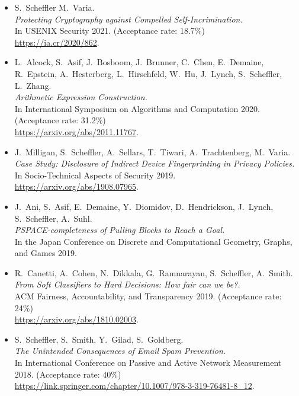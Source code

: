 \documentclass{res}
\begin{document}
\begin{resume}
\begin{itemize}
\item[\foregoneconclusion] S.~Scheffler M.~Varia. \\
\emph{Protecting Cryptography against Compelled Self-Incrimination.} \\
In USENIX Security 2021. (Acceptance rate: 18.7\%)\\
\url{https://ia.cr/2020/862}.

\item[\AEC] L.~Alcock, S.~Asif, J.~Bosboom, J.~Brunner, C.~Chen, E.~Demaine, R.~Epstein,
A.~Hesterberg, L.~Hirschfeld, W.~Hu, J.~Lynch, S.~Scheffler, L.~Zhang. \\
\emph{Arithmetic Expression Construction.} \\
In International Symposium on Algorithms and Computation 2020. (Acceptance rate: 31.2\%) \\
\url{https://arxiv.org/abs/2011.11767}.

\item[\devicefingerprinting] J.~Milligan, S.~Scheffler, A.~Sellars, T.~Tiwari, A.~Trachtenberg, M.~Varia.  \\
\emph{Case Study: Disclosure of Indirect Device Fingerprinting in Privacy Policies.} \\
In Socio-Technical Aspects of Security 2019. \\
\url{https://arxiv.org/abs/1908.07965}.

\item[\pullingblocks] J.~Ani, S.~Asif, E.~Demaine, Y.~Diomidov, D.~Hendrickson, J.~Lynch, S.~Scheffler, A.~Suhl. \\
\emph{PSPACE-completeness of Pulling Blocks to Reach a Goal.}  \\
In the Japan Conference on Discrete and Computational Geometry, Graphs, and Games 2019.

\item[\fairsibility] R.~Canetti, A.~Cohen, N.~Dikkala, G.~Ramnarayan, S.~Scheffler, A.~Smith. \\
\emph{From Soft Classifiers to Hard Decisions: How fair can we be?.} \\
ACM Fairness, Accountability, and Transparency 2019. (Acceptance rate: 24\%) \\
\url{https://arxiv.org/abs/1810.02003}.

\item[\emailspam] S.~Scheffler, S.~Smith, Y.~Gilad, S.~Goldberg. \\
\emph{The Unintended Consequences of Email Spam Prevention.} \\
In International Conference on Passive and Active Network Measurement 2018. (Acceptance rate: 40\%) \\
\url{https://link.springer.com/chapter/10.1007/978-3-319-76481-8\_12}.
\end{itemize}


\end{resume}
\end{document}
